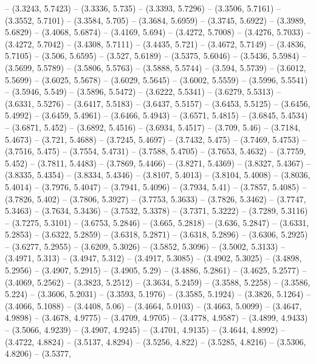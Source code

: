 {   -- (3.3243, 5.7423) -- (3.3336, 5.735) -- (3.3393, 5.7296) -- (3.3506, 
  5.7161) -- (3.3552, 5.7101) -- (3.3584, 5.705) -- (3.3684, 5.6959) -- (3.3745,
   5.6922) -- (3.3989, 5.6829) -- (3.4068, 5.6874) -- (3.4169, 5.694) -- 
  (3.4272, 5.7008) -- (3.4276, 5.7033) -- (3.4272, 5.7042) -- (3.4308, 5.7111) 
  -- (3.4435, 5.721) -- (3.4672, 5.7149) -- (3.4836, 5.7105) -- (3.506, 5.6595) 
  -- (3.527, 5.6189) -- (3.5375, 5.6046) -- (3.5436, 5.5984) -- (3.5699, 5.5789)
   -- (3.5806, 5.5763) -- (3.5888, 5.5744) -- (3.594, 5.5739) -- (3.6012, 
  5.5699) -- (3.6025, 5.5678) -- (3.6029, 5.5645) -- (3.6002, 5.5559) -- 
  (3.5996, 5.5541) -- (3.5946, 5.549) -- (3.5896, 5.5472) -- (3.6222, 5.5341) --
   (3.6279, 5.5313) -- (3.6331, 5.5276) -- (3.6417, 5.5183) -- (3.6437, 5.5157) 
  -- (3.6453, 5.5125) -- (3.6456, 5.4992) -- (3.6459, 5.4961) -- (3.6466, 
  5.4943) -- (3.6571, 5.4815) -- (3.6845, 5.4534) -- (3.6871, 5.452) -- (3.6892,
   5.4516) -- (3.6934, 5.4517) -- (3.709, 5.46) -- (3.7184, 5.4673) -- (3.721, 
  5.4688) -- (3.7245, 5.4697) -- (3.7432, 5.475) -- (3.7469, 5.4753) -- (3.7516,
   5.475) -- (3.7554, 5.4731) -- (3.7588, 5.4705) -- (3.7653, 5.4632) -- 
  (3.7759, 5.452) -- (3.7811, 5.4483) -- (3.7869, 5.4466) -- (3.8271, 5.4369) --
   (3.8327, 5.4367) -- (3.8335, 5.4354) -- (3.8334, 5.4346) -- (3.8107, 5.4013) 
  -- (3.8104, 5.4008) -- (3.8036, 5.4014) -- (3.7976, 5.4047) -- (3.7941, 
  5.4096) -- (3.7934, 5.41) -- (3.7857, 5.4085) -- (3.7826, 5.402) -- (3.7806, 
  5.3927) -- (3.7753, 5.3633) -- (3.7826, 5.3462) -- (3.7747, 5.3463) -- 
  (3.7634, 5.3436) -- (3.7532, 5.3378) -- (3.7371, 5.3222) -- (3.7289, 5.3116) 
  -- (3.7275, 5.3101) -- (3.6753, 5.2846) -- (3.665, 5.2818) -- (3.636, 5.2847) 
  -- (3.6331, 5.2853) -- (3.6322, 5.2859) -- (3.6318, 5.2871) -- (3.6318, 
  5.2896) -- (3.6306, 5.2925) -- (3.6277, 5.2955) -- (3.6209, 5.3026) -- 
  (3.5852, 5.3096) -- (3.5002, 5.3133) -- (3.4971, 5.313) -- (3.4947, 5.312) -- 
  (3.4917, 5.3085) -- (3.4902, 5.3025) -- (3.4898, 5.2956) -- (3.4907, 5.2915) 
  -- (3.4905, 5.29) -- (3.4886, 5.2861) -- (3.4625, 5.2577) -- (3.4069, 5.2562) 
  -- (3.3823, 5.2512) -- (3.3634, 5.2459) -- (3.3588, 5.2258) -- (3.3586, 5.224)
   -- (3.3606, 5.2031) -- (3.3593, 5.1976) -- (3.3585, 5.1924) -- (3.3826, 
  5.1264) -- (3.4066, 5.1088) -- (3.4408, 5.06) -- (3.4664, 5.0103) -- (3.4663, 
  5.0099) -- (3.4647, 4.9898) -- (3.4678, 4.9775) -- (3.4709, 4.9705) -- 
  (3.4778, 4.9587) -- (3.4899, 4.9433) -- (3.5066, 4.9239) -- (3.4907, 4.9245) 
  -- (3.4701, 4.9135) -- (3.4644, 4.8992) -- (3.4722, 4.8824) -- (3.5137, 
  4.8294) -- (3.5256, 4.822) -- (3.5285, 4.8216) -- (3.5306, 4.8206) -- (3.5377,
}
